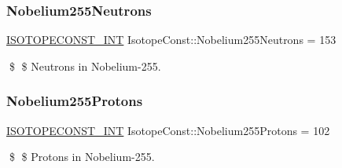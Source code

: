 \subsubsection{\texorpdfstring{Nobelium255\+Neutrons}{Nobelium255Neutrons}}
{\footnotesize\ttfamily \mbox{\hyperlink{group___isotope_const-_macros_ga5f18360b3e99483a35c32d789e62621c}{I\+S\+O\+T\+O\+P\+E\+C\+O\+N\+S\+T\+\_\+\+I\+NT}} Isotope\+Const\+::\+Nobelium255\+Neutrons = 153}

\$ \$ Neutrons in Nobelium-\/255. \mbox{\label{group___isotope_const-_nobelium-_no255_ga2e753f76ee4c26ed7b75cd5136ed4def}} 
\subsubsection{\texorpdfstring{Nobelium255\+Protons}{Nobelium255Protons}}
{\footnotesize\ttfamily \mbox{\hyperlink{group___isotope_const-_macros_ga5f18360b3e99483a35c32d789e62621c}{I\+S\+O\+T\+O\+P\+E\+C\+O\+N\+S\+T\+\_\+\+I\+NT}} Isotope\+Const\+::\+Nobelium255\+Protons = 102}

\$ \$ Protons in Nobelium-\/255. 